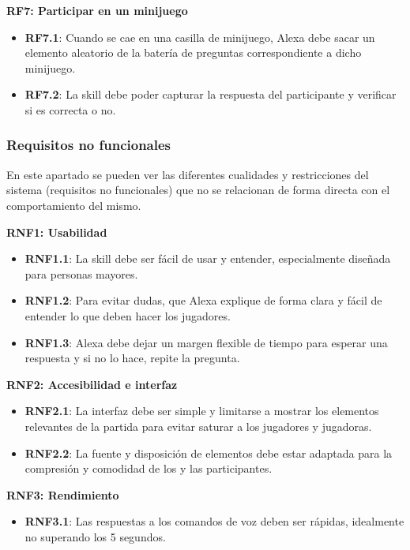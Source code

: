 \textbf{RF7: Participar en un minijuego}
\begin{itemize}
	\item \textbf{RF7.1}: Cuando se cae en una casilla de minijuego, Alexa debe sacar un elemento aleatorio de la batería de preguntas correspondiente a dicho minijuego.
	\item \textbf{RF7.2}: La skill debe poder capturar la respuesta del participante y verificar si es correcta o no.
\end{itemize}


\subsubsection{Requisitos no funcionales}

En este apartado se pueden ver las diferentes cualidades y restricciones del sistema (requisitos no funcionales) que no se relacionan de forma directa con el comportamiento del mismo.
\vspace{0.3cm}

\textbf{RNF1: Usabilidad}
\begin{itemize}
    \item \textbf{RNF1.1}: La skill debe ser fácil de usar y entender, especialmente diseñada para personas mayores.
    \item \textbf{RNF1.2}: Para evitar dudas, que Alexa explique de forma clara y fácil de entender lo que deben hacer los jugadores.
    \item \textbf{RNF1.3}: Alexa debe dejar un margen flexible de tiempo para esperar una respuesta y si no lo hace, repite la pregunta.
\end{itemize}

\textbf{RNF2: Accesibilidad e interfaz}
\begin{itemize}
    \item \textbf{RNF2.1}: La interfaz debe ser simple y limitarse a mostrar los elementos relevantes de la partida para evitar saturar a los jugadores y jugadoras.
    \item \textbf{RNF2.2}: La fuente y disposición de elementos debe estar adaptada para la compresión y comodidad de los y las participantes.
\end{itemize}

\textbf{RNF3: Rendimiento}
\begin{itemize}
    \item \textbf{RNF3.1}: Las respuestas a los comandos de voz deben ser rápidas, idealmente no superando los 5 segundos.
\end{itemize}

